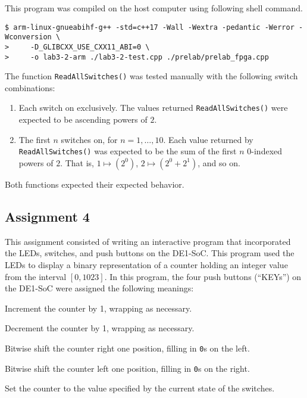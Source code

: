 \documentclass[11pt, letterpaper]{article} %
\begin{document}
This program was compiled on the host computer using following shell command.

\begin{lstlisting}[style=labreportstyle-sh]
$ arm-linux-gnueabihf-g++ -std=c++17 -Wall -Wextra -pedantic -Werror -Wconversion \
>     -D_GLIBCXX_USE_CXX11_ABI=0 \
>     -o lab3-2-arm ./lab3-2-test.cpp ./prelab/prelab_fpga.cpp
\end{lstlisting}

The function \texttt{ReadAllSwitches()} was tested manually with the following switch combinations:
\begin{enumerate}
    \item Each switch on exclusively. The values returned \texttt{ReadAllSwitches()} were expected to be ascending powers of $2$.
    \item The first $n$ switches on, for $n=1,\dotsc,10$. Each value returned by \texttt{ReadAllSwitches()} was expected to be the sum of the first $n$ $0$-indexed powers of $2$. That is, $1\mapsto (2^0)$, $2\mapsto (2^0 + 2^1)$, and so on.
\end{enumerate}

Both functions expected their expected behavior.

\subsection*{Assignment 4}

This assignment consisted of writing an interactive program that incorporated the LEDs, switches, and push buttons on the DE1-SoC. This program used the LEDs to display a binary representation of a counter holding an integer value from the interval $[0, 1023]$. In this program, the four push buttons (``KEYs'') on the DE1-SoC were assigned the following meanings:
\begin{description}[labelindent=0.5cm]
    \item[KEY0:] Increment the counter by 1, wrapping as necessary.
    \item[KEY1:] Decrement the counter by 1, wrapping as necessary.
    \item[KEY2:] Bitwise shift the counter right one position, filling in \texttt{0}s on the left.
    \item[KEY3:] Bitwise shift the counter left one position, filling in \texttt{0}s on the right.
    \item[Multiple Keys:] Set the counter to the value specified by the current state of the switches.
\end{description}
\end{document}

